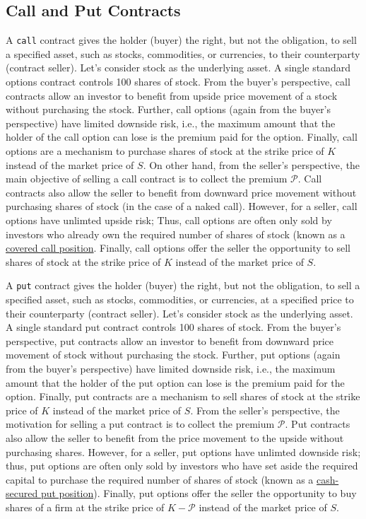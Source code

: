 \documentclass[11pt]{article}
\theoremstyle{definition}
\begin{document}
\subsection*{Call and Put Contracts}
A \texttt{call} contract gives the holder (buyer) the right, but not the obligation, to sell a specified asset, 
such as stocks, commodities, or currencies, to their counterparty (contract seller). 
Let's consider stock as the underlying asset. A single standard options contract controls 100 shares of stock. 
From the buyer's perspective, call contracts allow an investor to benefit from upside price movement of a stock without purchasing the stock.
Further, call options (again from the buyer's perspective) have limited downside risk, i.e., the maximum amount that the holder of the call option can lose 
is the premium paid for the option. Finally, call options are a mechanism to purchase shares of stock at the strike price of $K$ instead of the market price of $S$. 
On other hand, from the seller's perspective, the main objective of selling a call contract is to collect the premium $\mathcal{P}$. 
Call contracts also allow the seller to benefit from downward price movement without purchasing shares of stock (in the case of a naked call).
However, for a seller, call options have unlimted upside risk; 
Thus, call options are often only sold by investors who already own the required number of shares of stock 
(known as a \href{https://www.investopedia.com/terms/c/coveredcall.asp}{covered call position}. 
Finally, call options offer the seller the opportunity to sell shares of stock at the strike price of $K$ instead of the market price of $S$.

A \texttt{put} contract gives the holder (buyer) the right, but not the obligation, to sell a specified asset, 
such as stocks, commodities, or currencies, at a specified price to their counterparty (contract seller). 
Let's consider stock as the underlying asset. A single standard put contract controls 100 shares of stock.
From the buyer's perspective, put contracts allow an investor to benefit from downward price movement of stock without purchasing the stock. 
Further, put options (again from the buyer's perspective) have limited downside risk, i.e., the maximum amount that the holder of the put option can lose is the premium paid for the option. 
Finally, put contracts are a mechanism to sell shares of stock at the strike price of $K$ instead of the market price of $S$. 
From the seller's perspective, the motivation for selling a put contract is to collect the premium $\mathcal{P}$. 
Put contracts also allow the seller to benefit from the price movement to the upside without purchasing shares.
However, for a seller, put options have unlimted downside risk; 
thus, put options are often only sold by investors who have set aside the required capital to purchase the required number of shares of stock 
(known as a \href{https://www.fidelity.com/learning-center/investment-products/options/know-about-cash-covered-puts}{cash-secured put position}).
Finally, put options offer the seller the opportunity to buy shares of a firm at the strike price of $K-\mathcal{P}$ instead of the market price of $S$.
\end{document}
